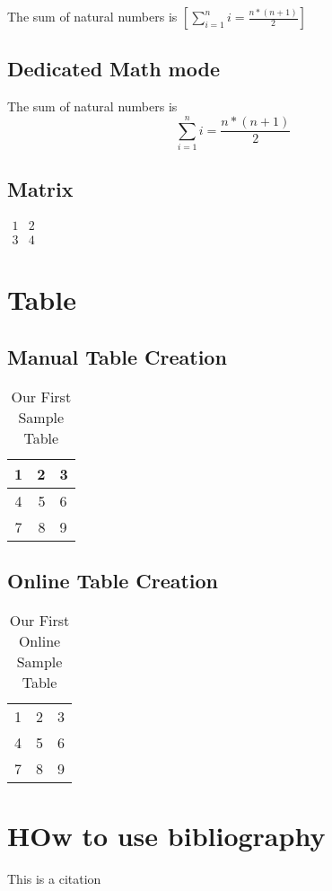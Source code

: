 \documentclass[a4paper,12pt]{report}
\begin{document}
	The sum of natural numbers is $\left[\sum^n_{i=1} i = \frac{n*(n+1)}{2}\right]$
	\section{Dedicated Math mode}
	The sum of natural numbers is $$\sum^n_{i=1} i = \frac{n*(n+1)}{2}$$
	\section{Matrix}
	$\begin{matrix}
		1 & 2 \\
		3 & 4
	\end{matrix}$
	
	\chapter{Table}
	\section{Manual Table Creation}
	\begin{table}[!h]
		\begin{center}
		\caption{Our First Sample Table}
		\vspace{1em}
		\begin{tabular}{||c|r|l||} 
			1 & 2 & 3 \\ \hline
			4 & 5 & 6 \\ 
			7 & 8 & 9
		\end{tabular}
		\end{center}
	\end{table}
	
	\section{Online Table Creation}
	\begin{table}[!h]
		\begin{center}
		\caption{Our First Online Sample Table}
		\vspace{1em}
		\begin{tabular}{lll}
1                      & 2                      & 3 \\ \cline{2-2}
\multicolumn{1}{l|}{4} & \multicolumn{1}{l|}{5} & 6 \\ \cline{2-2}
7                      & 8                      & 9
\end{tabular}
		\end{center}
	\end{table}
	
	\chapter{HOw to use bibliography}
	This is a citation \cite{baidoo2023education}\cite{abc}
	
	
\end{document}
